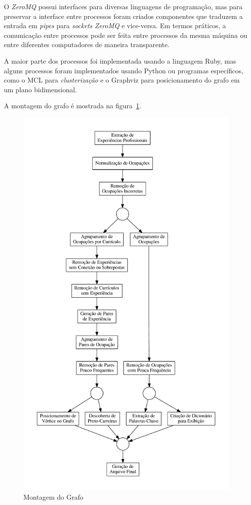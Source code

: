 \documentclass[12pt,a4paper,final]{article}
\begin{document}
O \textit{ZeroMQ} possui interfaces para diversas linguagens de programação, mas para preservar a interface entre processos foram criados componentes que traduzem a entrada em \textit{pipes} para \textit{sockets ZeroMQ} e vice-versa. Em termos práticos, a comunicação entre processos pode ser feita entre processos da mesma máquina ou entre diferentes computadores de maneira transparente.

A maior parte dos processos foi implementada usando a linguagem Ruby, mas alguns processos foram implementados usando Python ou programas específicos, como o MCL para \textit{clusterização} e o Graphviz para posicionamento do grafo em um plano bidimensional.

A montagem do grafo é mostrada na figura~\ref{fig:montagem-do-grafo}.

\begin{figure}[ht]
  \centering
  \includegraphics[scale=0.4]{pipeline1.pdf}
  \caption{Montagem do Grafo}
  \label{fig:montagem-do-grafo}
\end{figure}
\end{document}
